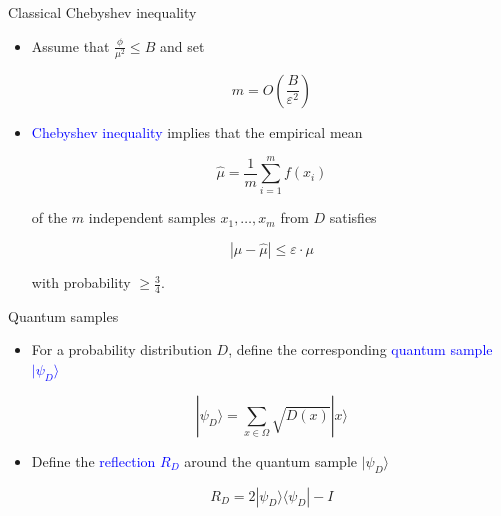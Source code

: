 \documentclass{beamer}
\renewcommand{\>}{\rangle}
\newcommand{\<}{\langle}
\begin{document}
\begin{frame}{Classical Chebyshev inequality}
    \begin{itemize}
        \item Assume that $\frac{\phi}{\mu^2} \le B$ and set 
        
        \begin{equation*}
            m = O\left( \frac{B}{\varepsilon^2} \right)
        \end{equation*}
        
        \medskip
        \item \textcolor{blue}{Chebyshev inequality} implies that the empirical mean
        
        \begin{equation*}
            \hat{\mu} = \frac{1}{m} \sum_{i=1}^m f(x_i)
        \end{equation*}
        
        of the $m$ independent samples $x_1,\ldots,x_m$ from $D$ satisfies
        
        \begin{equation*}
            |\mu - \hat{\mu}| \le \varepsilon \cdot \mu
        \end{equation*}
        
        with probability $\ge \frac{3}{4}$.
    \end{itemize}
\end{frame}

%

\begin{frame}{Quantum samples}
    \begin{itemize}
    \item For a probability distribution $D$, define the corresponding \textcolor{blue}{quantum sample $|\psi_D\>$}
    
    \begin{equation*}
        |\psi_D\> = \sum_{x\in \Omega} \sqrt{D(x)} |x\>
    \end{equation*}
    
    \medskip
    \item Define the \textcolor{blue}{reflection $R_D$} around the quantum sample $|\psi_D\>$
    
    \begin{equation*}
        R_D = 2|\psi_D\>\<\psi_D| - I
    \end{equation*}
    \end{itemize}
    
\end{frame}
\end{document}
